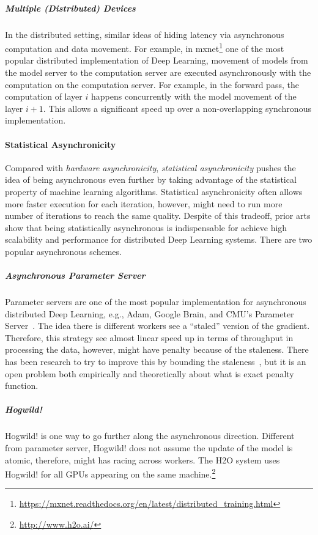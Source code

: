 \documentclass[12pt]{report}
\begin{document}
\subparagraph*{Multiple (Distributed) Devices} In the distributed setting,
similar ideas of hiding latency via asynchronous computation and data movement.
For example, in mxnet\footnote{\url{https://mxnet.readthedocs.org/en/latest/distributed_training.html}} one of the most popular distributed implementation of Deep Learning, movement of models from the model server to the computation server are
executed asynchronously with the computation on the computation server. For example,
in the forward pass, the computation of layer $i$ happens concurrently with the
model movement of the layer $i+1$. This allows a significant speed up over a
non-overlapping synchronous implementation.

\paragraph*{Statistical Asynchronicity} Compared with {\em hardware asynchronicity},
{\em statistical asynchronicity} pushes the idea of being asynchronous even further
by taking advantage of the statistical property of machine learning algorithms.
Statistical asynchronicity often allows more faster execution for each iteration,
however, might need to run more number of iterations to reach the same quality.
Despite of this tradeoff, prior arts show that being statistically asynchronous
is indispensable for achieve high scalability and performance for distributed 
Deep Learning systems. There are two popular asynchronous schemes.

\subparagraph*{Asynchronous Parameter Server} Parameter servers are one of
the most popular implementation for asynchronous distributed Deep Learning,
e.g., Adam, Google Brain, and CMU's Parameter Server~\cite{Dean:2012:NIPS,Chilimbi:2014:OSDI,186214}. The idea there is different workers see a ``staled'' version of
the gradient. Therefore, this strategy see almost linear speed up in terms of
throughput in processing the data, however, might have penalty because of the
staleness. There has been research to try to improve this by bounding
the staleness~\cite{2013arXiv1312.7869W}, but it is an open problem both empirically and
theoretically about what is exact penalty function.

\subparagraph*{Hogwild!} Hogwild! is one way to go further along the asynchronous
direction. Different from parameter server, Hogwild! does not assume the update
of the model is atomic, therefore, might has racing across workers. The H2O system
uses Hogwild! for all GPUs appearing on the same machine.\footnote{\url{http://www.h2o.ai/}}
\end{document}
